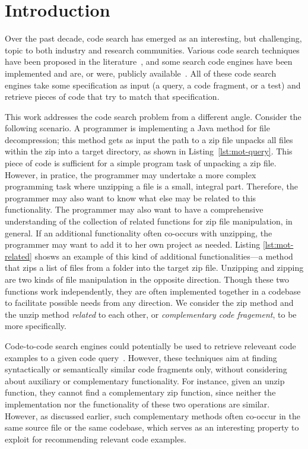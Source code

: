 \section{Introduction}
\label{sec:intro}

Over the past decade, code search has emerged as an interesting, but
challenging, topic to both industry and research communities. Various code search
techniques have been proposed in the
literature~\cite{bajracharya2009sourcerer,reiss2009semantics,lazzarini2009applying,mcmillan2012exemplar}, and
some search code engines have been implemented and are, or were, publicly
available~\cite{googlesearch, github,codase,krugle,ohloh,searchcode}. All
of these code search engines take some specification as input (a
query, a code fragment, or a test) and retrieve pieces of code that try
to match that specification.


This work addresses the code search problem from a different angle. Consider
the following scenario. A programmer is implementing a Java method for
file decompression; this method gets as input the path to a zip file
 unpacks all files within the zip into a target directory, as shown in 
 Listing~\ref{lst:mot-query}. This piece of code is sufficient for 
 a simple program task of unpacking a zip file. However, in pratice, the programmer 
 may undertake a more complex programming task where unzipping a file is a small,
 integral part. Therefore, the programmer may also want to know what else may be
related to this functionality. %
The programmer may also want to have a comprehensive understanding of the collection of related
functions for zip file manipulation, in general. If an additional
functionality often co-occurs with unzipping, the programmer may want to add it
to her own project as needed. Listing \ref{lst:mot-related} shosws an example of this kind of additional 
functionalities---a method that zips a list of files from a folder into the target zip file. Unzipping
and zipping are two kinds of file manipulation in the opposite direction. 
Though these two functions work independently, they are often implemented together in a codebase to facilitate
possible needs from any direction. We consider the zip method and the unzip method {\em related} to each other, or {\em complementary code fragement}, to be more specifically.



Code-to-code search engines could potentially be used to retrieve releveant code examples
to a given code query~\cite{kim2018Facoy, krugle, searchcode}. 
However, these techniques aim at finding syntactically or semantically 
similar code fragments only, without considering about auxiliary or complementary functionality. 
For instance, given an unzip function, they cannot find a complementary zip function, since neither
the implementation nor the functionality of these two operations are similar. However, as discussed earlier,
such complementary methods often co-occur in the same source file or the same codebase, which serves as 
an interesting property to exploit for recommending relevant code examples.

